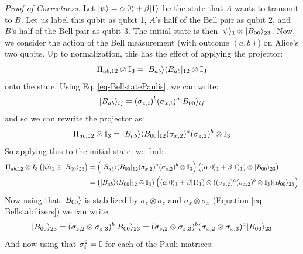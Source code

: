 \noindent
\textit{Proof of Correctness.} Let $\lvert \psi \rangle = \alpha\lvert 0 \rangle + \beta\lvert 1 \rangle$ be the state that $A$ wants to transmit to $B$. Let us label this qubit as qubit 1, $A$'s half of the Bell pair as qubit 2, and $B$'s half of the Bell pair as qubit 3. The initial state is then $\lvert \psi \rangle_1 \otimes \lvert B_{00} \rangle_{23}$. Now, we consider the action of the Bell measurement (with outcome $(a, b)$) on Alice's two qubits. Up to normalization, this has the effect of applying the projector:
\begin{equation}
    \Pi_{ab, 12} \otimes \mathbb{I}_3 = \lvert B_{ab} \rangle \langle B_{ab} \rvert_{12} \otimes \mathbb{I}_3
\end{equation}
onto the state. Using Eq. \eqref{eq-BellstatePaulis}, we can write:
\begin{equation}
    \lvert B_{ab} \rangle_{ij} = (\sigma_{z, i})^b(\sigma_{x, i})^a\lvert B_{00} \rangle_{ij}
\end{equation}
and so we can rewrite the projector as:
\begin{equation}
    \Pi_{ab, 12} \otimes \mathbb{I}_3 = \lvert B_{ab} \rangle \langle B_{00} \rvert_{12}(\sigma_{x, 2})^a(\sigma_{z, 2})^b \otimes \mathbb{I}_3
\end{equation}
So applying this to the initial state, we find:
\begin{equation}\label{eq-qteleportpart1}
    \begin{split}
        \Pi_{ab, 12} \otimes I_3\left(\lvert \psi \rangle_1 \otimes \lvert B_{00} \rangle_{23}\right) &= \left( \lvert B_{ab} \rangle \langle B_{00} \rvert_{12}(\sigma_{x, 2})^a(\sigma_{z, 2})^b \otimes \mathbb{I}_3\right)\left((\alpha\lvert 0 \rangle_1 + \beta\lvert 1 \rangle_1) \otimes \lvert B_{00} \rangle_{23}\right)
        \\ &=  \left( \lvert B_{ab} \rangle \langle B_{00} \rvert_{12} \otimes \mathbb{I}_3\right) \left((\alpha\lvert 0 \rangle_1 + \beta\lvert 1 \rangle_1) \otimes ((\sigma_{x, 2})^a(\sigma_{z, 2})^b \otimes \mathbb{I}_3) \lvert B_{00} \rangle_{23}\right)
    \end{split}
\end{equation}
Now using that $\lvert B_{00} \rangle$ is stabilized by $\sigma_z \otimes \sigma_z$ and $\sigma_x \otimes \sigma_x$ (Equation \eqref{eq-Bellstabilizers}) we can write:
\begin{equation}
    \lvert B_{00} \rangle_{23} = (\sigma_{z, 2} \otimes \sigma_{z, 3})^b\lvert B_{00} \rangle_{23} = (\sigma_{z, 2} \otimes \sigma_{z, 3})^b(\sigma_{x, 2} \otimes \sigma_{x, 3})^a\lvert B_{00} \rangle_{23}
\end{equation} 
And now using that $\sigma_i^2 = \mathbb{I}$ for each of the Pauli matrices:
